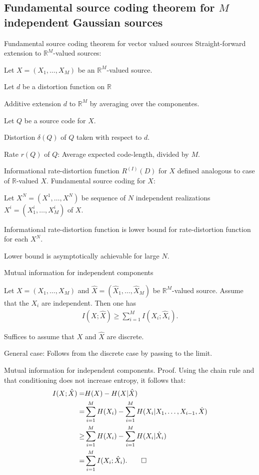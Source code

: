 \subsection{Fundamental source coding theorem for $M$ independent Gaussian sources}
\begin{frame}{Fundamental source coding theorem for vector valued sources}
Straight-forward extension to $\mathbb{R}^M$-valued sources: 
\bit
\item Let $X=(X_1,\dots,X_M)$ be an $\mathbb{R}^M$-valued source.
\item Let $d$ be a distortion function on $\mathbb{R}$
\item Additive extension $d$ to $\mathbb{R}^M$ by averaging over the componentes.
\item Let $Q$ be a source code for $X$.
\item Distortion $\delta(Q)$ of $Q$ taken with respect to $d$.
\item Rate $r(Q)$ of $Q$: Average expected code-length, divided by $M$. 
\item Informational rate-distortion function $R^{(I)}(D)$ for $X$ defined analogous to case of $\mathbb{R}$-valued $X$. 
\eit
Fundamental source coding for $X$:
\bit
\item Let $X^N=(X^1,\dots,X^N)$ be sequence of $N$ independent realizations $X^i=(X_1^i,\dots,X_M^i)$ of $X$.
\item Informational rate-distortion function is lower bound for rate-distortion function for each $X^N$.
\item Lower bound is asymptotically achievable for large $N$. 
\eit
\end{frame}

\begin{frame}{Mutual information for independent components}
\begin{lemma}
Let $X=(X_1,\dots,X_M)$ and $\hat{X}=(\hat{X}_1,\dots,\hat{X}_M)$ be $\mathbb{R}^M$-valued source. Assume that the $X_i$ are independent. 
Then one has 
\begin{align*}
I(X;\hat{X})\geq \sum_{i=1}^MI(X_i;\hat{X}_i). 
\end{align*}
\end{lemma} 
\bit
\item Suffices to assume that $X$ and $\hat{X}$ are discrete.
\item General case: Follows from the discrete case by passing to the limit. 
\eit
\end{frame}
\begin{frame}{Mutual information for independent components. Proof.}
Using the chain rule and that conditioning does not increase entropy, it follows that: 
\begin{align*}
I(X;{\hat{X}})=&H(X)-H(X|\hat{X})\\
=&\sum_{i=1}^MH(X_i)-\sum_{i=1}^MH(X_i|X_1,\dots,X_{i-1},\hat{X})\\
\geq & \sum_{i=1}^MH(X_i)-\sum_{i=1}^MH(X_i|{\hat{X}}_i)\\
=&\sum_{i=1}^M I(X_i;\hat{X}_i).\qed 
\end{align*}
\end{frame}

